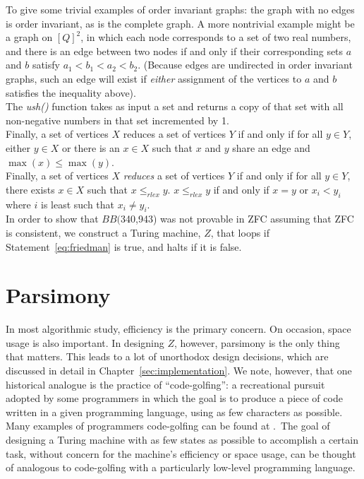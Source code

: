 \documentclass[11pt]{report}
\newcommand{\bbstatenum}{$BB($340,943) }
\begin{document}
To give some trivial examples of order invariant graphs: the graph with no edges is order invariant, as is the complete graph. A more nontrivial example might be a graph on $[Q]^2$, in which each node corresponds to a set of two real numbers, and there is an edge between two nodes if and only if their corresponding sets $a$ and $b$ satisfy $a_1 < b_1 < a_2 < b_2$. (Because edges are undirected in order invariant graphs, such an edge will exist if \emph{either} assignment of the vertices to $a$ and $b$ satisfies the inequality above). \\

The \emph{ush()} function takes as input a set and returns a copy of that set with all non-negative numbers in that set incremented by 1. \\ 

Finally, a set of vertices $X$ reduces a set of vertices $Y$ if and only if for all $y \in Y$, either $y \in X$ or there is an $x \in X$ such that $x$ and $y$ share an edge and $\max(x) \le \max(y)$. \\

Finally, a set of vertices $X$ \emph{reduces} a set of vertices $Y$ if and only if for all $y \in Y$, there exists $x \in X$ such that $x \le_{rlex} y$. $x \le_{rlex} y$ if and only if $x = y$ or $x_i < y_i$ where $i$ is least such that $x_i \not= y_i$.~\cite{personalcomm} \\

In order to show that \bbstatenum was not provable in ZFC assuming that ZFC is consistent, we construct a Turing machine, $Z$, that loops if Statement~\ref{eq:friedman} is true, and halts if it is false. 

\section{Parsimony}

In most algorithmic study, efficiency is the primary concern. On occasion, space usage is also important. In designing $Z$, however, parsimony is the only thing that matters. This leads to a lot of unorthodox design decisions, which are discussed in detail in Chapter~\ref{sec:implementation}. We note, however, that one historical analogue is the practice of ``code-golfing'': a recreational pursuit adopted by some programmers in which the goal is to produce a piece of code written in a given programming language, using as few characters as possible. Many examples of programmers code-golfing can be found at \cite{codegolf}.~The goal of designing a Turing machine with as few states as possible to accomplish a certain task, without concern for the machine's efficiency or space usage, can be thought of analogous to code-golfing with a particularly low-level programming language. \\
\end{document}
